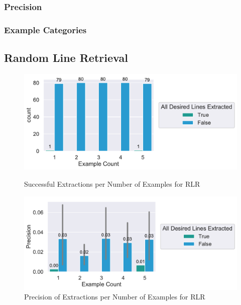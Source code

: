 \documentclass[\myrootdir/main.tex]{subfiles}
\begin{document}
\subsubsection{Precision}
\subsubsection{Example Categories}


\subsection{Random Line Retrieval}

\begin{figure}[htbp]
	\centering
	\begin{minipage}{0.45\textwidth}
		\centering
		\includegraphics[width=\textwidth, clip]{img/big-study/success-examples-RLR.pdf}
		\caption{Successful Extractions per Number of Examples for RLR}
		\label{fig:success-examples-rlr}
	\end{minipage}\hfill
	\begin{minipage}{0.45\textwidth}
		\centering
		\includegraphics[width=\textwidth, clip]{img/big-study/precision-RLR.pdf}
		\caption{Precision of Extractions per Number of Examples for RLR}
		\label{fig:precision-rlr}
	\end{minipage}
\end{figure}
\end{document}
